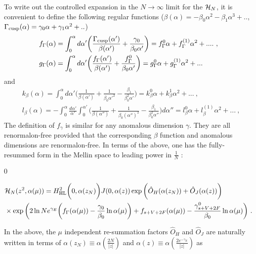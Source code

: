\documentclass[a4paper,11pt]{article}
\newenvironment{bbox}
{\par\smallskip\centering\begin{lrbox}{0}%
\begin{minipage}[c]{0.99\textwidth}}
{\end{minipage}\end{lrbox}%
\framebox[0.99\textwidth]{\usebox{0}}%
\par\medskip}
\begin{document}
To write out the controlled expansion in the $N\rightarrow \infty$ limit for the ${\cal H}_N$, it is convenient to define the following regular functions ($\beta(\alpha)=-\beta_0\alpha^2-\beta_1\alpha^3+..$, $\Gamma_{\rm cusp}(\alpha)=\gamma_0\alpha+\gamma_1\alpha^2+..$)
\begin{align}
&f_{\Gamma}(\alpha)=\int_{0}^{\alpha}d\alpha'\bigg(\frac{\Gamma_{\rm cusp}(\alpha')}{\beta(\alpha')}+\frac{\gamma_0}{\beta_0 \alpha'}\bigg)=f_{\Gamma}^{0}\alpha+f_{\Gamma}^{(1)}\alpha^2+.... \ ,  \\ 
&g_{\Gamma}(\alpha)=\int_{0}^{\alpha}d\alpha'\bigg(\frac{f_{\Gamma}(\alpha')}{\beta(\alpha')}+\frac{f_{\Gamma}^0}{\beta_0 \alpha'}\bigg)= g_{\Gamma}^{0}\alpha+g_{\Gamma}^{(1)}\alpha^2+...
\end{align}
and 
\begin{align}
&k_{\beta}(\alpha)=\int_{0}^{\alpha}d\alpha' \bigg(\frac{1}{\beta(\alpha')}+\frac{1}{\beta_0 \alpha'^2}-\frac{\beta_1}{\beta_0^2 \alpha'}\bigg)=k_{\beta}^0\alpha+k_{\beta}^1\alpha^2+...  \ , \nonumber \\ 
&l_{\beta}(\alpha)=
-\int_{0}^{\alpha}\frac{d\alpha'}{\alpha'} \int_{0}^{\alpha'} \bigg(\frac{1}{\beta(\alpha'')}+\frac{1}{\beta_0 (\alpha'')^2}-\frac{\beta_1}{\beta_0^2 \alpha''}\bigg) d\alpha''=l_{\beta}^{0}\alpha+l_{\beta}^{(1)}\alpha^2+... \ ,
\end{align}
The definition of $f_{\gamma}$ is similar for any anomalous dimension $\gamma$. They are all renormalon-free provided that the corresponding $\beta$ function and anomalous dimensions are renormalon-free. In terms of the above, one has the fully-resummed form in the Mellin space to leading power in $\frac{1}{N}$ :
\begin{bbox}
\begin{align}\label{eq:thresholdcon}
&{\cal H}_N(z^2,\alpha(\mu))=  H_{\rm HL}^2\bigg(0,\alpha(z_N)\bigg)J(0,\alpha(z))\exp \bigg(\hat O_H(\alpha(z_N))+\hat O_J(\alpha(z))\bigg) \nonumber \\ 
& \times \exp \bigg(2\ln Ne^{\gamma_E}\bigg(f_{\Gamma}(\alpha(\mu))-\frac{\gamma_0}{\beta_0}\ln \alpha(\mu)\bigg)+f_{s+V+2F}(\alpha(\mu))-\frac{\gamma^0_{s+V+2F}}
{\beta_0}\ln \alpha(\mu)\bigg)  \ .
\end{align}
\end{bbox} 
In the above, the $\mu$ independent re-summation factors $\hat O_H$ and $\hat O_J$ are naturally written in terms of $\alpha(z_N)\equiv \alpha \left(\frac{2N}{|z|}\right)$ and $\alpha(z) \equiv \alpha\left(\frac{2e^{-\gamma_E}}{|z|}\right)$ as
\end{document}
